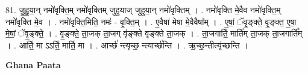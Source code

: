 \documentclass[17pt]{extarticle}
\begin{document}
81. जु॒हु॒या॒न् नमो॑वृक्ति॒म् नमो॑वृक्तिम् जुहुयाज् जुहुया॒न् नमो॑वृक्तिम् । . नमो॑वृक्ति मे॒वैव नमो॑वृक्ति॒म् नमो॑वृक्ति मे॒व । . नमो॑वृक्ति॒मिति॒ नमः॑ - वृ॒क्ति॒म् । . ए॒वैषा॑ मेषा मे॒वैवैषा᳚म् । . ए॒षां॒ ॅवृ॒ङ्क्ते॒ वृ॒ङ्क्त॒ ए॒षा॒ मे॒षां॒ ॅवृ॒ङ्क्ते॒ । . वृ॒ङ्क्ते॒ ता॒जक् ता॒जग् वृ॑ङ्क्ते वृङ्क्ते ता॒जक् । . ता॒जगार्ति॒ मार्ति॑म् ता॒जक् ता॒जगार्ति᳚म् । . आर्ति॒ मा ऽऽर्ति॒ मार्ति॒ मा । . आर्च्छ॑ न्त्यृच्छ॒ न्त्यार्च्छ॑न्ति । . ऋ॒च्छ॒न्तीत्यृ॑च्छन्ति । \newline

\textbf{Ghana Paata } \newline
\end{document}
